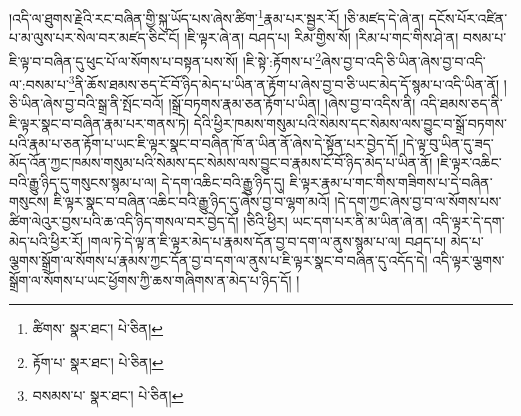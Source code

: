 །འདི་ལ་ཐུགས་རྗེའི་རང་བཞིན་གྱི་སྐུ་ཡོད་པས་ཞེས་ཚིག་\footnote{ཚིགས་  སྣར་ཐང་།  པེ་ཅིན། }རྣམ་པར་སྦྱར་རོ། །ཅི་མཛད་དེ་ཞེ་ན། དངོས་པོར་འཛིན་པ་མ་ལུས་པར་སེལ་བར་མཛད་ཅིང་ངོ། །ཇི་ལྟར་ཞེ་ན། བཤད་པ། རིམ་གྱིས་སོ། །རིམ་པ་གང་གིས་ཤེ་ན། བསམ་པ་ཇི་ལྟ་བ་བཞིན་དུ་ཕུང་པོ་ལ་སོགས་པ་བསྟན་པས་སོ། །ཇི་སྟེ་:རྟོགས་པ་\footnote{རྟོག་པ་  སྣར་ཐང་།  པེ་ཅིན། }ཞེས་བྱ་བ་འདི་ཅི་ཡིན་ཞེས་བྱ་བ་འདི་ལ་:བསམ་པ་\footnote{བསམས་པ་  སྣར་ཐང་།  པེ་ཅིན། }ནི་ཆོས་ཐམས་ཅད་ངོ་བོ་ཉིད་མེད་པ་ཡིན་ན་རྟོག་པ་ཞེས་བྱ་བ་ཅི་ཡང་མེད་དོ་སྙམ་པ་འདི་ཡིན་ནོ། །ཅི་ཡིན་ཞེས་བྱ་བའི་སྒྲ་ནི་སྤོང་བའོ། །སྒྲོ་བཏགས་རྣམ་ཅན་རྟོག་པ་ཡིན། །ཞེས་བྱ་བ་འདིས་ནི། འདི་ཐམས་ཅད་ནི་ཇི་ལྟར་སྣང་བ་བཞིན་རྣམ་པར་གནས་ཏེ། དེའི་ཕྱིར་ཁམས་གསུམ་པའི་སེམས་དང་སེམས་ལས་བྱུང་བ་སྒྲོ་བཏགས་པའི་རྣམ་པ་ཅན་རྟོག་པ་ཡང་ཇི་ལྟར་སྣང་བ་བཞིན་ཁོ་ན་ཡིན་ནོ་ཞེས་དེ་སྟོན་པར་བྱེད་དོ། །དེ་ལྟ་བུ་ཡིན་དུ་ཟད་མོད་འོན་ཀྱང་ཁམས་གསུམ་པའི་སེམས་དང་སེམས་ལས་བྱུང་བ་རྣམས་ངོ་བོ་ཉིད་མེད་པ་ཡིན་ནོ། །ཇི་ལྟར་འཆིང་བའི་རྒྱུ་ཉིད་དུ་གསུངས་སྙམ་པ་ལ། དེ་དག་འཆིང་བའི་རྒྱུ་ཉིད་དུ། ཇི་ལྟར་རྣམ་པ་གང་གིས་གཟིགས་པ་དེ་བཞིན་གསུངས། ཇི་ལྟར་སྣང་བ་བཞིན་འཆིང་བའི་རྒྱུ་ཉིད་དུ་ཞེས་བྱ་བ་ལྷག་མའོ། །དེ་དག་ཀྱང་ཞེས་བྱ་བ་ལ་སོགས་པས་ཚིག་ལེའུར་བྱས་པའི་ཆ་འདི་ཉིད་གསལ་བར་བྱེད་དོ། །ཅིའི་ཕྱིར། ཡང་དག་པར་ནི་མ་ཡིན་ཞེ་ན། འདི་ལྟར་དེ་དག་མེད་པའི་ཕྱིར་རོ། །གལ་ཏེ་དེ་ལྟ་ན་ཇི་ལྟར་མེད་པ་རྣམས་དོན་བྱ་བ་དག་ལ་ནུས་སྙམ་པ་ལ། བཤད་པ། མེད་པ་ལྕགས་སྒྲོག་ལ་སོགས་པ་རྣམས་ཀྱང་དོན་བྱ་བ་དག་ལ་ནུས་པ་ཇི་ལྟར་སྣང་བ་བཞིན་དུ་འདོད་དེ། འདི་ལྟར་ལྕགས་སྒྲོག་ལ་སོགས་པ་ཡང་ཕྱོགས་ཀྱི་ཆས་གཞིགས་ན་མེད་པ་ཉིད་དོ། །
